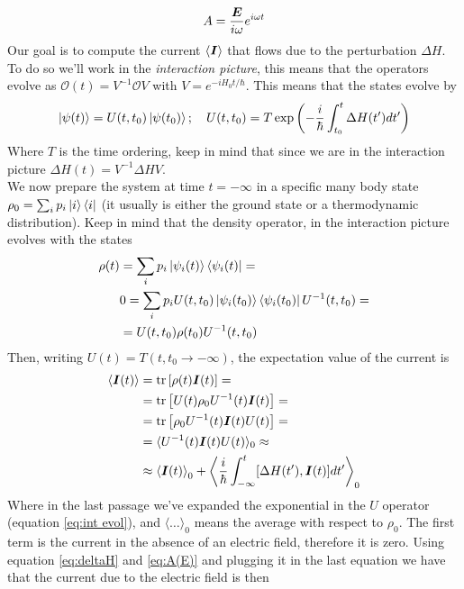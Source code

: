 \begin{equation}
    A=\frac{ \boldsymbol{E}}{i\omega}e^{i\omega t}
    \label{eq:A(E)}
\end{equation}
Our goal is to compute the current $\langle \boldsymbol{I}\rangle$ that flows due to the perturbation $\Delta H$. To do so we'll work in the \textit{interaction picture}, this means that the operators evolve as $\mathcal O(t)=V^{-1}\mathcal O V$ with $V=e^{-iH_0t/\hbar}$. This means that the states evolve by 
\begin{equation}
    \ket{\psi(t)}=U(t,t_0)\ket{\psi(t_0)}; \quad 
    U(t,t_0)=T\exp\left(-\frac i\hbar \int_{t_0}^t\Delta H(t')dt'\right)
    \label{eq:int evol}
\end{equation}
Where $T$ is the time ordering, keep in mind that since we are in the interaction picture $\Delta H(t)=V^{-1}\Delta HV$.\\
We now prepare the system at time $t=-\infty$ in a specific many body state $\rho_0=\sum_i p_i\ket{i}\bra{i}$ (it usually is either the ground state or a thermodynamic distribution). Keep in mind that the density operator, in the interaction picture evolves with the states
\begin{equation}
\begin{split}
        \rho(t)&=\sum_ip_i\ket{\psi_i(t)}\bra{\psi_i(t)}=\\
        &0=\sum_ip_iU(t,t_0)\ket{\psi_i(t_0)}\bra{\psi_i(t_0)}U^{-1}(t,t_0)=\\
        &=U(t,t_0)\rho(t_0)U^{-1}(t,t_0)
\end{split}
\end{equation}
Then, writing $U(t)=T(t,t_0\to-\infty)$, the expectation value of the current is
\begin{equation}
    \begin{split}
        \langle \boldsymbol{I}(t)\rangle &= \tr\left[\rho(t)\boldsymbol{I}(t)\right]=\\
        &=\tr\left[U(t)\rho_0 U^{-1}(t) \boldsymbol{I}(t)\right]=\\
        &=\tr\left[\rho_0 U^{-1}(t) \boldsymbol{I}(t)U(t)\right]=\\
        &=\langle U^{-1}(t) \boldsymbol{I}(t)U(t)\rangle_{0}\approx\\
        &\approx\left\langle\boldsymbol{I}(t)\right\rangle_{0} +
        \left\langle \frac i\hbar \int_{-\infty}^t[\Delta H(t'),\boldsymbol{I}(t)]dt'\right\rangle_0
    \end{split}
\end{equation}
Where in the last passage we've expanded the exponential in the $U$ operator (equation \ref{eq:int evol}), and $\langle \dots\rangle_0$ means the average with respect to $\rho_0$. The first term is the current in the absence of an electric field, therefore it is zero. Using equation \ref{eq:deltaH} and \ref{eq:A(E)} and plugging it in the last equation we have that the current due to the electric field is then
